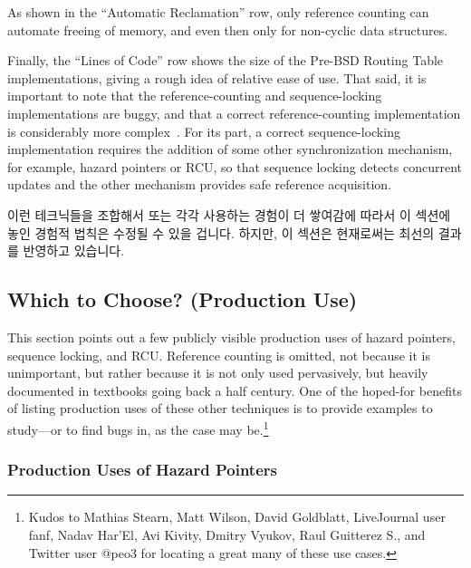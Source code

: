 As shown in the ``Automatic Reclamation'' row, only reference
counting can automate freeing of memory, and even then only
for non-cyclic data structures.

Finally, the ``Lines of Code'' row shows the size of the Pre-BSD
Routing Table implementations, giving a rough idea of relative ease of use.
That said, it is important to note that the reference-counting and
sequence-locking implementations are buggy, and that a correct
reference-counting implementation is considerably
more complex~\cite{Valois95a,MagedMichael95a}.
For its part, a correct sequence-locking implementation requires
the addition of some other synchronization mechanism, for example,
hazard pointers or RCU, so that sequence locking detects concurrent
updates and the other mechanism provides safe reference acquisition.
\fi

이런 테크닉들을 조합해서 또는 각각 사용하는 경험이 더 쌓여감에 따라서 이 섹션에
놓인 경험적 법칙은 수정될 수 있을 겁니다.
하지만, 이 섹션은 현재로써는 최선의 결과를 반영하고 있습니다.
\iffalse

As more experience is gained using these techniques, both separately
and in combination, the rules of thumb laid out in this section will
need to be refined.
However, this section does reflect the current state of the art.
\fi

\subsection{Which to Choose? (Production Use)}
\label{sec:defer:Which to Choose? (Production Use)}

This section points out a few publicly visible production uses of
hazard pointers, sequence locking, and RCU.
Reference counting is omitted, not because it is unimportant, but rather
because it is not only used pervasively, but heavily documented in textbooks
going back a half century.
One of the hoped-for benefits of listing production uses of these other
techniques is to provide examples to study---or to find bugs in, as
the case may be.\footnote{
	Kudos to Mathias Stearn, Matt Wilson, David Goldblatt,
	LiveJournal user fanf, Nadav Har'El, Avi Kivity, Dmitry Vyukov,
	Raul Guitterez S., and Twitter user @peo3 for locating a
	great many of these use cases.}

\subsubsection{Production Uses of Hazard Pointers}
\label{sec:defer:Production Uses of Hazard Pointers}

